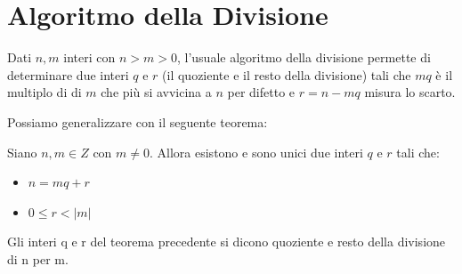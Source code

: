\documentclass[a4paper,12pt, oneside]{book}
\begin{document}
\chapter{Algoritmo della Divisione}
	\begin{algoritmo} 
		Dati $n,m$ interi con $n > m > 0$, l'usuale algoritmo della divisione permette di determinare due interi $q$ e $r$ (il quoziente e il resto della divisione) tali che $mq$ è il multiplo di di $m$ che più si avvicina a $n$ per difetto e $r = n - mq$ misura lo scarto.
	\end{algoritmo}
	Possiamo generalizzare con il seguente teorema:
	\begin{teorema}
		Siano $n, m \in Z$ con $m \not = 0$. Allora esistono e sono unici due interi $q$ e $r$ tali che:
		\begin{itemize}
			\item $n = mq + r$
			\item $0 \leq r < |m|$
		\end{itemize}
	\end{teorema}
	\begin{definizione}
		Gli interi q e r del teorema precedente si dicono quoziente e resto della divisione di n per m.
	\end{definizione}
\end{document}
